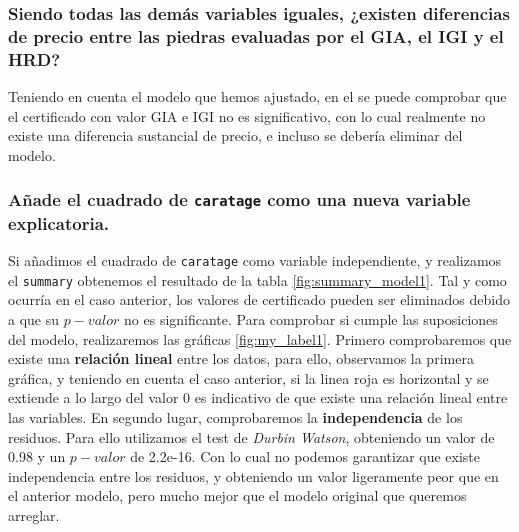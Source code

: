 \documentclass[a4paper, 7pt]{article}
\begin{document}
\subsubsection{Siendo todas las demás variables iguales, ¿existen diferencias de precio entre las piedras evaluadas por el GIA, el IGI y el HRD? }

Teniendo en cuenta el modelo que hemos ajustado, en el se puede comprobar que el certificado con valor GIA e IGI no es significativo, con lo cual realmente no existe una diferencia sustancial de precio, e incluso se debería eliminar del modelo. 

\subsubsection{Añade el cuadrado de \texttt{caratage} como una nueva variable explicatoria.}

Si añadimos el cuadrado de \texttt{caratage} como variable independiente, y realizamos el \texttt{summary} obtenemos el resultado de la tabla \ref{fig:summary_model1}. Tal y como ocurría en el caso anterior, los valores de certificado pueden ser eliminados debido a que su $p-valor$ no es significante. Para comprobar si cumple las suposiciones del modelo, realizaremos las gráficas \ref{fig:my_label1}. Primero comprobaremos que existe una \textbf{relación lineal} entre los datos, para ello, observamos la primera gráfica, y teniendo en cuenta el caso anterior, si la linea roja es horizontal y se extiende a lo largo del valor 0 es indicativo de que existe una relación lineal entre las variables. En segundo lugar, comprobaremos la \textbf{independencia} de los residuos. Para ello utilizamos el test de \textit{Durbin Watson}, obteniendo un valor de 0.98 y un $p-valor$ de 2.2e-16. Con lo cual no podemos garantizar que existe independencia entre los residuos, y obteniendo un valor ligeramente peor que en el anterior modelo, pero mucho mejor que el modelo original que queremos arreglar.\\
\end{document}
